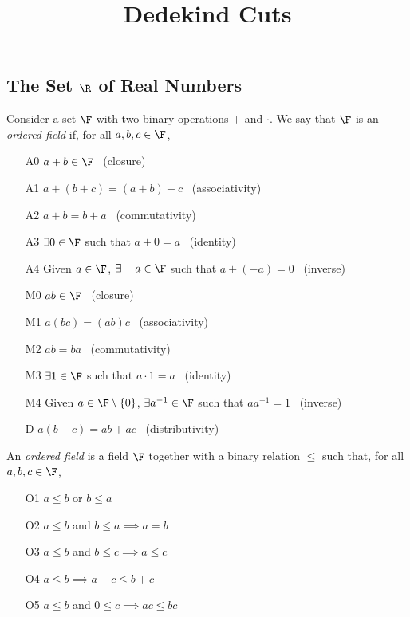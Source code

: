 \graphicspath{{notes/1completeness/}}

\title{Dedekind Cuts}
\maketitle

\thispagestyle{empty}

\subsection{The Set $\R$ of Real Numbers}

\begin{axioms}[Field]\label{axiom:field}
Consider a set $\F$ with two binary operations $+$ and $\cdot$. We say that $\F$ is an \emph{ordered field} if, for all $a,b,c\in\F$,
\begin{itemize}
\item[A0] $a+b\in\F$ \ (closure)
\item[A1] $a+(b+c)=(a+b)+c$ \ (associativity)
\item[A2] $a+b=b+a$ \ (commutativity)
\item[A3] $\exists 0\in\F$ such that $a+0=a$ \ (identity)
\item[A4] Given $a\in\F$, $\exists -a\in\F$ such that $a+(-a)=0$ \ (inverse)
\item[M0] $ab\in\F$ \ (closure)
\item[M1] $a(bc)=(ab)c$ \ (associativity)
\item[M2] $ab=ba$ \ (commutativity)
\item[M3] $\exists 1\in\F$ such that $a\cdot 1=a$ \ (identity)
\item[M4] Given $a\in\F\setminus\{0\}$, $\exists a^{-1}\in\F$ such that $aa^{-1}=1$ \ (inverse)
\item[D] $a(b+c)=ab+ac$ \ (distributivity)
\end{itemize}
\end{axioms}

\begin{axioms}\label{axiom:ord}
An \emph{ordered field} is a field $\F$ together with a binary relation $\le$ such that, for all $a,b,c\in\F$,
\begin{itemize}
	\item[O1] $a\le b$ or $b\le a$
	\item[O2] $a\le b$ and $b\le a\implies a=b$
	\item[O3] $a\le b$ and $b\le c\implies a\le c$
	\item[O4] $a\le b\implies a+c\le b+c$
	\item[O5] $a\le b$ and $0\le c\implies ac\le bc$
\end{itemize}
\end{axioms}

